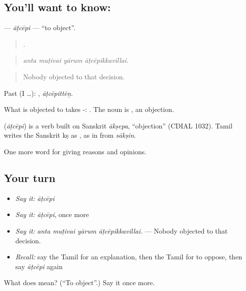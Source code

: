 \subsection*{You'll want to know: }
\textbf{} — \emph{āṭcēpi} — \textquotedblleft{}to object\textquotedblright{}.

\begin{quote}
   .
\end{quote}

\begin{quote}
\emph{anta muṭivai yārum āṭcēpikkavillai.}
\end{quote}

\begin{quote}
Nobody objected to that decision.
\end{quote}

Past (I …): , \emph{āṭcēpittēṉ}.

What is objected to takes -:  . The noun is , an objection.

\begin{cousinweb}
\textbf{} (\emph{āṭcēpi}) is a verb built on Sanskrit \emph{ākṣepa}, \textquotedblleft{}objection\textquotedblright{} (CDIAL 1032). Tamil writes the Sanskrit kṣ as , as in  from \emph{sākṣin}.
\end{cousinweb}

\begin{grammarlens}[title={What you've built}]
One more word for giving reasons and opinions.
\end{grammarlens}

\subsection*{Your turn}
\begin{itemize}
\raggedright
  \item \emph{Say it:} \emph{āṭcēpi}
  \item \emph{Say it:} \emph{āṭcēpi}, once more
  \item \emph{Say it:} \emph{anta muṭivai yārum āṭcēpikkavillai.} — Nobody objected to that decision.
  \item \emph{Recall:} say the Tamil for an explanation, then the Tamil for to oppose, then say \emph{āṭcēpi} again
\end{itemize}

\begin{tcolorbox}[breakable,colback=teal!4,colframe=teal!35!black,title={Before you move on}]
What does  mean? (\textquotedblleft{}To object\textquotedblright{}.) Say it once more.
\end{tcolorbox}
